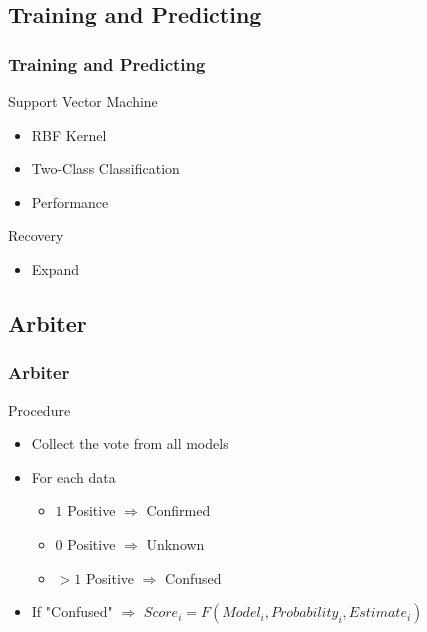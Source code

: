 \documentclass[11pt,slidestop,mathserif,compress]{beamer}
\begin{document}
\subsection{Training and Predicting}

\begin{frame}
	\frametitle{Training and Predicting}
	\begin{block}{Support Vector Machine}
		\begin{itemize}
			\item	RBF Kernel
			\item	Two-Class Classification
			\item	Performance
		\end{itemize}
	\end{block}
	\pause
	\begin{block}{Recovery}
		\begin{itemize}
			\item	Expand
		\end{itemize}
	\end{block}
\end{frame}

\subsection{Arbiter}
\begin{frame}
	\frametitle{Arbiter}
	\begin{block}{Procedure}
		\begin{itemize}
			\item	Collect the vote from all models
			\item	For each data
					\begin{itemize}
						\item	$1$ Positive $\Rightarrow$ Confirmed
						\item	$0$ Positive $\Rightarrow$ Unknown
						\item	$>1$ Positive $\Rightarrow$ Confused
					\end{itemize}
			\item	If "Confused" $\Rightarrow$ $Score_i = F(Model_i, Probability_i, Estimate_i)$
		\end{itemize}
	\end{block}
\end{frame}
\end{document}
